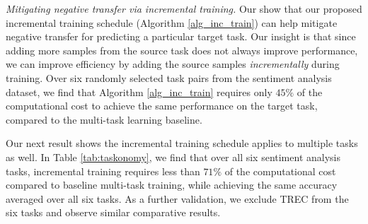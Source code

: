 \textit{Mitigating negative transfer via incremental training.}
Our show that our proposed incremental training schedule (Algorithm \ref{alg_inc_train}) can help mitigate negative transfer for predicting a particular target task.
Our insight is that since adding more samples from the source task does not always improve performance, we can improve efficiency by adding the source samples \textit{incrementally} during training.
Over six randomly selected task pairs from the sentiment analysis dataset, we find that Algorithm \ref{alg_inc_train} requires only $45\%$ of the computational cost to achieve the same performance on the target task, compared to the multi-task learning baseline.


Our next result shows the incremental training schedule applies to multiple tasks as well.
In Table \ref{tab:taskonomy}, we find that over all six sentiment analysis tasks, incremental training requires less than $71\%$ of the computational cost compared to baseline multi-task training, while achieving the same accuracy averaged over all six tasks.
As a further validation, we exclude TREC from the six tasks and observe similar comparative results.


